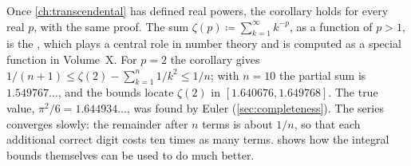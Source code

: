 Once \cref{ch:transcendental} has defined real powers, the corollary holds for every real $p$, with the same proof. The sum $\zeta(p)\coloneqq\sum_{k=1}^\infty k^{-p}$, as a function of $p>1$, is the , which plays a central role in number theory and is computed as a special function in Volume~X. For $p=2$ the corollary gives $1/(n+1)\le\zeta(2)-\sum_{k=1}^n1/k^2\le1/n$; with $n=10$ the partial sum is $1.549767\ldots$, and the bounds locate $\zeta(2)$ in $[1.640676,1.649768]$. The true value, $\pi^2/6=1.644934\ldots$, was found by Euler (\cref{sec:completeness}). The series converges slowly: the remainder after $n$ terms is about $1/n$, so that each additional correct digit costs ten times as many terms.  shows how the integral bounds themselves can be used to do much better.

